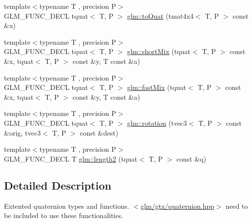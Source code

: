 \begin{DoxyCompactItemize}
\item 
{\footnotesize template$<$typename T , precision P$>$ }\\G\-L\-M\-\_\-\-F\-U\-N\-C\-\_\-\-D\-E\-C\-L tquat$<$ T, P $>$ \hyperlink{group__gtx__quaternion_ga808dd0f83ee8150db7e652313bde8eb2}{glm\-::to\-Quat} (tmat4x4$<$ T, P $>$ const \&x)
\item 
{\footnotesize template$<$typename T , precision P$>$ }\\G\-L\-M\-\_\-\-F\-U\-N\-C\-\_\-\-D\-E\-C\-L tquat$<$ T, P $>$ \hyperlink{group__gtx__quaternion_ga3534443de2a1a806f386976546cddc81}{glm\-::short\-Mix} (tquat$<$ T, P $>$ const \&x, tquat$<$ T, P $>$ const \&y, T const \&a)
\item 
{\footnotesize template$<$typename T , precision P$>$ }\\G\-L\-M\-\_\-\-F\-U\-N\-C\-\_\-\-D\-E\-C\-L tquat$<$ T, P $>$ \hyperlink{group__gtx__quaternion_gac11bf550f17d1da14423595a27575084}{glm\-::fast\-Mix} (tquat$<$ T, P $>$ const \&x, tquat$<$ T, P $>$ const \&y, T const \&a)
\item 
{\footnotesize template$<$typename T , precision P$>$ }\\G\-L\-M\-\_\-\-F\-U\-N\-C\-\_\-\-D\-E\-C\-L tquat$<$ T, P $>$ \hyperlink{group__gtx__quaternion_gac4856d356c5c97cec74e9b672ea89240}{glm\-::rotation} (tvec3$<$ T, P $>$ const \&orig, tvec3$<$ T, P $>$ const \&dest)
\item 
{\footnotesize template$<$typename T , precision P$>$ }\\G\-L\-M\-\_\-\-F\-U\-N\-C\-\_\-\-D\-E\-C\-L T \hyperlink{group__gtx__quaternion_ga02b45352c7ac345cabc9e877314acda6}{glm\-::length2} (tquat$<$ T, P $>$ const \&q)
\end{DoxyCompactItemize}


\subsection{Detailed Description}
Extented quaternion types and functions. $<$\hyperlink{gtx_2quaternion_8hpp}{glm/gtx/quaternion.\-hpp}$>$ need to be included to use these functionalities. 

